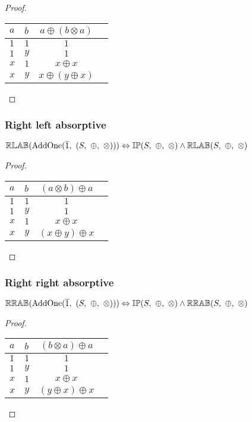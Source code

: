 \documentclass[10pt, ../Summary.tex]{subfiles}
\begin{document}
\begin{proof}
\begin{center}
\begin{tabular}{llcc}
\toprule
$a$ & $b$ & $a \oplus (b \otimes a)$ \\
\midrule
$1$ & $1$ & $1$ 			\\
$1$ & $y$ & $1$				\\
$x$ & $1$ & $x \oplus x$	\\
$x$ & $y$ & $x \oplus (y \oplus x)$	\\
\bottomrule
\end{tabular}
\end{center}
\end{proof}



\subsubsection{Right left absorptive}

\begin{theorem} \label{thm:addone_right_left_absorptive}
$\propname{RLAB}(\mathrm{AddOne}(\overline{1},\ (S,\ \oplus,\ \otimes))) \Leftrightarrow \propname{IP}(S,\ \oplus,\ \otimes) \wedge \propname{RLAB}(S,\ \oplus,\ \otimes)$
\end{theorem}

\begin{proof}
\begin{center}
\begin{tabular}{llcc}
\toprule
$a$ & $b$ & $(a \otimes b) \oplus a$ \\
\midrule
$1$ & $1$ & $1$ 			\\
$1$ & $y$ & $1$				\\
$x$ & $1$ & $x \oplus x$	\\
$x$ & $y$ & $(x \oplus y) \oplus x$	\\
\bottomrule
\end{tabular}
\end{center}
\end{proof}





\subsubsection{Right right absorptive}

\begin{theorem} \label{thm:addone_right_right_absorptive}
$\propname{RRAB}(\mathrm{AddOne}(\overline{1},\ (S,\ \oplus,\ \otimes))) \Leftrightarrow \propname{IP}(S,\ \oplus,\ \otimes) \wedge \propname{RRAB}(S,\ \oplus,\ \otimes)$
\end{theorem}

\begin{proof}
\begin{center}
\begin{tabular}{llcc}
\toprule
$a$ & $b$ & $(b \otimes a) \oplus a$ \\
\midrule
$1$ & $1$ & $1$ 			\\
$1$ & $y$ & $1$				\\
$x$ & $1$ & $x \oplus x$	\\
$x$ & $y$ & $(y \oplus x) \oplus x$	\\
\bottomrule
\end{tabular}
\end{center}
\end{proof}
\end{document}

